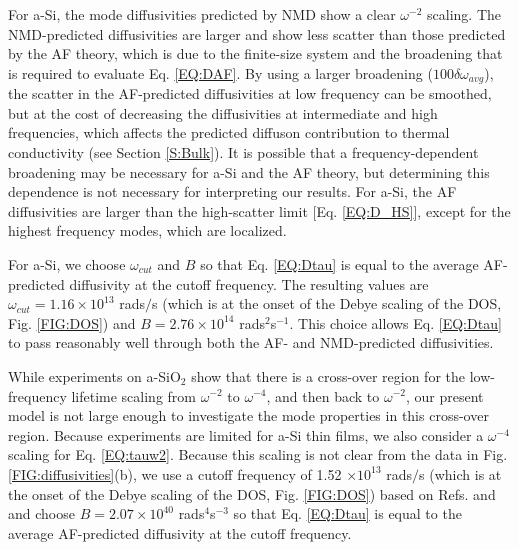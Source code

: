\documentclass[aps,prb,onecolumn,preprint,superscriptaddress,footinbib,amsmath,amssymb,floatfix]{revtex4}
\begin{document}
For a-Si, the mode diffusivities predicted by NMD 
show a clear $\omega^{-2}$ scaling. 
The NMD-predicted diffusivities are larger and show less 
scatter than those predicted by the AF theory, which is due to 
the finite-size system and the broadening that is 
required to evaluate 
Eq. \eqref{EQ:DAF}.\cite{feldman_thermal_1993} By using a larger 
broadening ($100\delta\omega_{avg}$), the scatter 
in the AF-predicted 
diffusivities at low frequency can be smoothed, but at the cost of 
decreasing the diffusivities at intermediate and 
high frequencies, which 
affects the predicted diffuson contribution to thermal 
conductivity (see Section \ref{S:Bulk}). 
It is possible that a frequency-dependent broadening may be 
necessary for a-Si and the AF theory,  
but determining this dependence is not necessary for 
interpreting our results. 
For a-Si, the AF diffusivities are 
larger than the high-scatter limit [Eq. \eqref{EQ:D_HS}], 
except for the highest frequency modes, which are localized.
\cite{feldman_thermal_1993} 

For a-Si, we choose $\omega_{cut}$  
and $B$ so that Eq. \eqref{EQ:Dtau} is equal 
to the average AF-predicted diffusivity at the cutoff frequency. 
The resulting values are 
$\omega_{cut}=1.16 \times 10^{13}$ rads$/$s (which is at the onset 
of the Debye scaling of the DOS, Fig. \ref{FIG:DOS})  
and $B=2.76\times10^{14}$ rads$^2$s$^{-1}$. This choice 
allows Eq. \eqref{EQ:Dtau} to pass reasonably well through both 
the AF- and NMD-predicted diffusivities. 

While experiments on a-SiO$_2$ show that there is a cross-over 
region for the low-frequency lifetime scaling from $\omega^{-2}$ to 
$\omega^{-4}$,\cite{masciovecchio_evidence_2006} 
and then back to $\omega^{-2}$,
\cite{masciovecchio_evidence_2006,baldi_sound_2010,
baldi_elastic_2011,baldi_emergence_2013} our present model is not 
large enough to investigate the mode properties 
in this cross-over region. 
Because experiments are limited for a-Si thin films, 
\cite{hondongwa_ultrasonic_2011} 
we also consider a $\omega^{-4}$ scaling 
for Eq. \eqref{EQ:tauw2}. Because this scaling is not clear from 
the data in Fig. \ref{FIG:diffusivities}(b),  
we use a cutoff frequency of 1.52 $\times 10^{13}$ rads$/$s 
(which is at the onset 
of the Debye scaling of the DOS, Fig. \ref{FIG:DOS}) 
based on Refs.  and 
and choose $B=2.07\times10^{40}$ rads$^4$s$^{-3}$ so that 
Eq. \eqref{EQ:Dtau} is equal to the average 
AF-predicted diffusivity at the cutoff frequency. 
\end{document}
